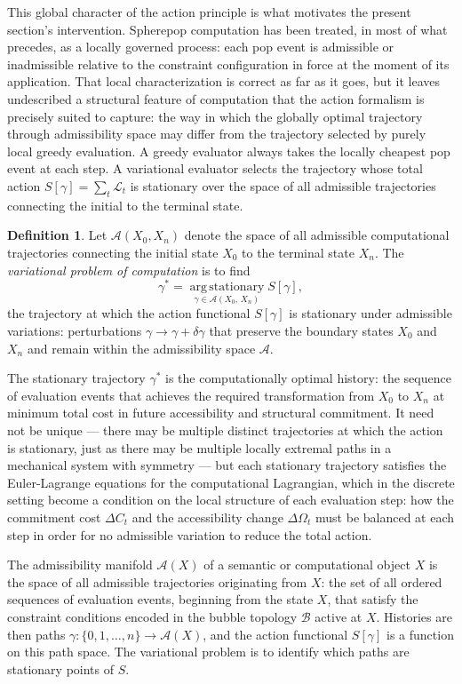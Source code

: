 \documentclass[12pt,openany]{book}
\theoremstyle{plain}
\theoremstyle{definition}
\newtheorem{definition}[theorem]{Definition}
\theoremstyle{remark}
\begin{document}
This global character of the action principle is what motivates the present section's intervention. Spherepop computation has been treated, in most of what precedes, as a locally governed process: each pop event is admissible or inadmissible relative to the constraint configuration in force at the moment of its application. That local characterization is correct as far as it goes, but it leaves undescribed a structural feature of computation that the action formalism is precisely suited to capture: the way in which the globally optimal trajectory through admissibility space may differ from the trajectory selected by purely local greedy evaluation. A greedy evaluator always takes the locally cheapest pop event at each step. A variational evaluator selects the trajectory whose total action $S[\gamma] = \sum_t \mathcal{L}_t$ is stationary over the space of all admissible trajectories connecting the initial to the terminal state.

\begin{definition}
Let $\mathcal{A}(X_0, X_n)$ denote the space of all admissible computational trajectories connecting the initial state $X_0$ to the terminal state $X_n$. The \emph{variational problem of computation} is to find
\[
  \gamma^* = \operatorname*{arg\,stationary}_{\gamma \in \mathcal{A}(X_0,\, X_n)} S[\gamma],
\]
the trajectory at which the action functional $S[\gamma]$ is stationary under admissible variations: perturbations $\gamma \to \gamma + \delta\gamma$ that preserve the boundary states $X_0$ and $X_n$ and remain within the admissibility space $\mathcal{A}$.
\end{definition}

The stationary trajectory $\gamma^*$ is the computationally optimal history: the sequence of evaluation events that achieves the required transformation from $X_0$ to $X_n$ at minimum total cost in future accessibility and structural commitment. It need not be unique — there may be multiple distinct trajectories at which the action is stationary, just as there may be multiple locally extremal paths in a mechanical system with symmetry — but each stationary trajectory satisfies the Euler-Lagrange equations for the computational Lagrangian, which in the discrete setting become a condition on the local structure of each evaluation step: how the commitment cost $\Delta C_t$ and the accessibility change $\Delta\Omega_t$ must be balanced at each step in order for no admissible variation to reduce the total action.

The admissibility manifold $\mathcal{A}(X)$ of a semantic or computational object $X$ is the space of all admissible trajectories originating from $X$: the set of all ordered sequences of evaluation events, beginning from the state $X$, that satisfy the constraint conditions encoded in the bubble topology $\mathcal{B}$ active at $X$. Histories are then paths $\gamma : \{0, 1, \ldots, n\} \to \mathcal{A}(X)$, and the action functional $S[\gamma]$ is a function on this path space. The variational problem is to identify which paths are stationary points of $S$.
\end{document}
